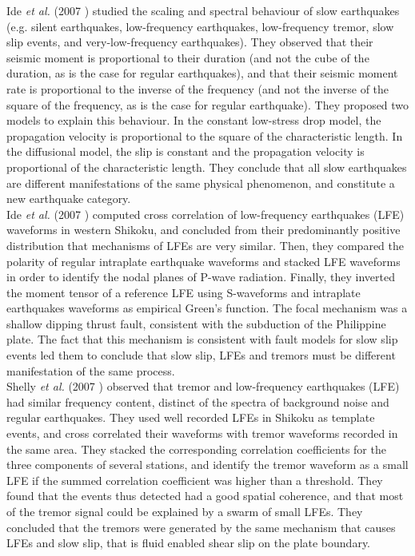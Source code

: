 \documentclass[main.tex]{subfiles}
\begin{document}
Ide \textit{et al.} (2007 \cite{IDE_2007_nature}) studied the scaling and spectral behaviour of slow earthquakes (e.g. silent earthquakes, low-frequency earthquakes, low-frequency tremor, slow slip events, and very-low-frequency earthquakes). They observed that their seismic moment is proportional to their duration (and not the cube of the duration, as is the case for regular earthquakes), and that their seismic moment rate is proportional to the inverse of the frequency (and not the inverse of the square of the frequency, as is the case for regular earthquake). They proposed two models to explain this behaviour. In the constant low-stress drop model, the propagation velocity is proportional to the square of the characteristic length. In the diffusional model, the slip is constant and the propagation velocity is proportional of the characteristic length. They conclude that all slow earthquakes are different manifestations of the same physical phenomenon, and constitute a new earthquake category. \\

Ide \textit{et al.} (2007 \cite{IDE_2007_GRL}) computed cross correlation of low-frequency earthquakes (LFE) waveforms in western Shikoku, and concluded from their predominantly positive distribution that mechanisms of LFEs are very similar. Then, they compared the polarity of regular intraplate earthquake waveforms and stacked LFE waveforms in order to identify the nodal planes of P-wave radiation. Finally, they inverted the moment tensor of a reference LFE using S-waveforms and intraplate earthquakes waveforms as empirical Green's function. The focal mechanism was a shallow dipping thrust fault, consistent with the subduction of the Philippine plate. The fact that this mechanism is consistent with fault models for slow slip events led them to conclude that slow slip, LFEs and tremors must be different manifestation of the same process. \\

Shelly \textit{et al.} (2007 \cite{SHE_2007_nature}) observed that tremor and low-frequency earthquakes (LFE) had similar frequency content, distinct of the spectra of background noise and regular earthquakes. They used well recorded LFEs in Shikoku as template events, and cross correlated their waveforms with tremor waveforms recorded in the same area. They stacked the corresponding correlation coefficients for the three components of several stations, and identify the tremor waveform as a small LFE if the summed correlation coefficient was higher than a threshold. They found that the events thus detected had a good spatial coherence, and that most of the tremor signal could be explained by a swarm of small LFEs. They concluded that the tremors were generated by the same mechanism that causes LFEs and slow slip, that is fluid enabled shear slip on the plate boundary. \\
\end{document}
